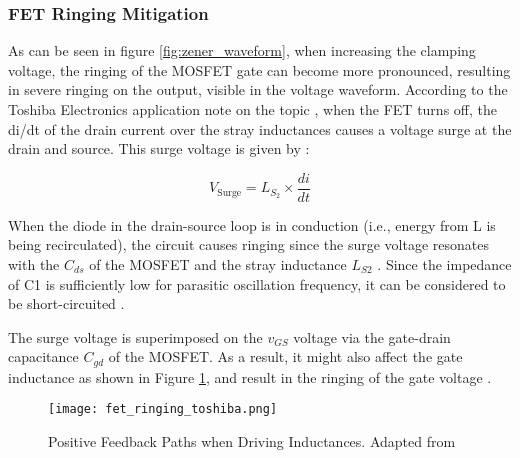             \subsubsection{FET Ringing Mitigation}

                As can be seen in figure \ref{fig:zener_waveform}, when increasing the clamping voltage, the ringing of the MOSFET gate can become more pronounced, resulting in severe ringing on the output, visible in the voltage waveform. According to the Toshiba Electronics application note on the topic \autocite{toshibaelectronicdevices&storagecorporationParasiticOscillationRinging}, when the FET turns off, the di/dt of the drain current over the stray inductances causes a voltage surge at the drain and source. This surge voltage is given by \autocite{toshibaelectronicdevices&storagecorporationParasiticOscillationRinging}:

                \begin{equation}
                V_{\text{Surge}} = L_{S_2} \times \frac{di}{dt}
                \end{equation}

                When the diode in the drain-source loop is in conduction (i.e., energy from L is being recirculated), the circuit causes ringing since the surge voltage resonates with the $C_{ds}$ of the MOSFET and the stray inductance $L_{S2}$ \autocite{toshibaelectronicdevices&storagecorporationParasiticOscillationRinging}. Since the impedance of C1 is sufficiently low for parasitic oscillation frequency, it can be considered to be short-circuited \autocite{toshibaelectronicdevices&storagecorporationParasiticOscillationRinging}.

                The surge voltage is superimposed on the $v_{GS}$ voltage via the gate-drain capacitance $C_{gd}$ of the MOSFET. As a result, it might also affect the gate inductance as shown in Figure \ref{fig:ringing_mitigation}, and result in the ringing of the gate voltage \autocite{toshibaelectronicdevices&storagecorporationParasiticOscillationRinging}.

                \begin{figure}[H]
                    \centering
                    \texttt{[image: fet\_ringing\_toshiba.png]}
                    \caption{Positive Feedback Paths when Driving Inductances. Adapted from \autocite{toshibaelectronicdevices&storagecorporationParasiticOscillationRinging}}
                    \label{fig:ringing_mitigation}
                \end{figure}

